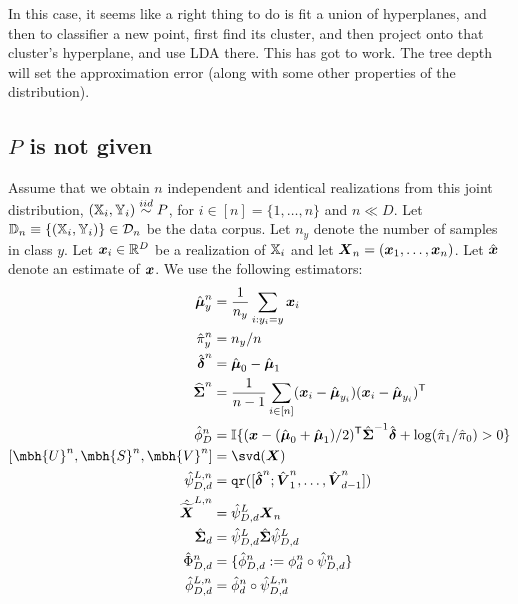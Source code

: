 \documentclass[10pt]{article}
\begin{document}
In this case, it seems like a right thing to do is fit a union of hyperplanes, and then to classifier a new point, first find its cluster, and then project onto that cluster's hyperplane, and use LDA there.  This has got to work. The tree depth will set the approximation error  (along with some other properties of the distribution).


\subsection{$P$ is not given}

Assume that we obtain $n$ independent and identical realizations from this joint distribution, $(\mathbb{X}_i,\mathbb{Y}_i) \overset{iid}{\sim} P$, for $i \in [n]=\{1,\ldots, n\}$ and $n \ll D$.  Let $\mathbb{D}_n \equiv \{(\mathbb{X}_i,\mathbb{Y}_i)\} \in \mathcal{D}_n$ be the data corpus.   Let $n_y$ denote the number of samples in class $y$.
Let $\boldsymbol{x}_i \in \mathbb{R}^D$ be a realization of $\mathbb{X}_i$ and let $\boldsymbol{X}_n=(\boldsymbol{x}_1,\ldots, \boldsymbol{x}_n)$.
Let $\hat{\boldsymbol{x}}$ denote an estimate of $\boldsymbol{x}$.  We use the following estimators:
\begin{align}
	\mhb{\mu}_y^n &= \frac{1}{n_y} \sum_{i : y_i=y} \bx_i \\
	\mh{\pi}_y^n &= n_y/n \\
	\mhb{\delta}^n&= \mhb{\mu}_0 - \mhb{\mu}_1 \\
	\wh{\bSig}^n&= \frac{1}{n-1} \sum_{i \in [n]} (\bx_i - \mhb{\mu}_{y_i}) (\bx_i - \mhb{\mu}_{y_i})\T \\
	\mh{\phi}_{D}^n &= \II\{(\bx - (\mh{\bmu}_0+\mh{\bmu}_1)/2)\T \mh{\bSig}^{-1} \mhb{\del} + \log  (\mh{\pi}_1 / \mh{\pi}_0) > 0\} \\
	[\mbh{U}^n, \mbh{S}^n,\mbh{V}^n] &= \svd(\mb{X})\\
	\mh{\psi}_{D,d}^{L,n} &=\qr([ \mhb{\delta}^n; \mhb{V}_1^n,\ldots, \mhb{V}_{d-1}^n]) \\
	\mh{\mbt{X}}^{L,n} &= \mh{\psi}_{D,d}^L \mb{X}_n \\
	\mh{\bSig}_d &= \mh{\psi}_{D,d}^L \mh{\bSig} {\mh{\psi}_{D,d}^L} \\
	\mh{\Phi}_{D,d}^n &= \{ \mh{\phi}_{D,d}^n := {\phi}_{d}^n \circ \mh{\psi}_{D,d}^n\} \\
	\mh{\phi}_{D,d}^{L,n} &= \mh{\phi}_{d}^n \circ \mh{\psi}_{D,d}^{L,n} 
\end{align}
\end{document}
